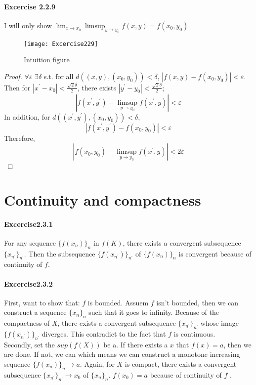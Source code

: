 \paragraph{Excercise 2.2.9}
I will only show $\lim_{x\rightarrow x_{0}}\limsup_{y\rightarrow y_{0}}f(x,y)=f(x_{0},y_{0})$
\begin{figure}[H]
\centering
\texttt{[image: Excercise229]}
\caption{Intuition figure}
\end{figure}
\begin{proof}
$\forall\varepsilon$ $\exists \delta$ s.t. for all $d((x,y),(x_{0},y_{0}))<\delta$, $|f(x,y)-f(x_{0},y_{0})|<\varepsilon$.\\Then for $|x^\prime-x_{0}|<\frac{\sqrt{2}\delta}{2}$, there exists $|y^\prime-y_{0}|<\frac{\sqrt{2}\delta}{2}$;
\[|f(x^\prime,y^\prime)-\limsup_{y\rightarrow y_{0}}f(x^\prime,y)|<\varepsilon\]
In addition, for $d((x^\prime,y^\prime),(x_{0},y_{0}))<\delta$,
\[|f(x^\prime,y^\prime)-f(x_{0},y_{0})|<\varepsilon
\]
Therefore,
\[|f(x_{0},y_{0})-\limsup_{y\rightarrow y_{0}}f(x^\prime,y)|<2\varepsilon
\]


\end{proof}
\section{Continuity and compactness}
\paragraph{Excercise2.3.1}
For any sequence $\{f(x_{n})\}_{n}$ in $f(K)$, there exists a convergent subsequence $\{x_{n^\prime}\}_{n^\prime}$. Then the subsequence $\{f(x_{n^\prime})\}_{n^\prime}$ of $\{f(x_{n})\}_{n}$ is convergent because of continuity of $f$.
\paragraph{Excercise2.3.2}First, want to show that: $f$ is bounded. Assuem $f$ isn't bounded, then we can construct a sequence $\{x_{n}\}_{n}$ such that it goes to infinity. Because of the compactness of $X$, there exists a convergent subsequence $\{x_{n^\prime}\}_{n^\prime}$ whose image
$\{f(x_{n^\prime})\}_{n^\prime}$ diverges. This contradict to the fact that $f$ is continuous.\\
Secondly, set the $sup(f(X))$ be a. If there exists a $x$ that $f(x)=a$, then we are done. If not, we can  which means we can construct a monotone increasing sequence $\{f(x_{n})\}_{n}\rightarrow a$. Again, for $X$ is compact, there exists a convergent subsequence $\{x_{n^\prime}\}_{n^\prime}\rightarrow x_{0}$ of $\{x_{n}\}_{n}$. $f(x_{0})=a$ because of continuity of $f$  \Lightning.
